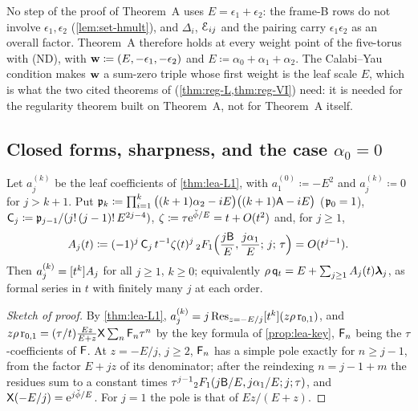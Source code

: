 \begin{rmk}
\label{rmk:lea-cy}
No step of the proof of Theorem~A uses $E=\epsilon_1+\epsilon_2$: the frame-B rows do not involve $\epsilon_1,\epsilon_2$ (\cref{lem:set-hmult}), and $\Delta_i$, $\mathcal{E}_{ij}$ and the pairing carry $\epsilon_1\epsilon_2$ as an overall factor. Theorem~A therefore holds at every weight point of the five-torus with (ND), with $\mathbf{w}\coloneqq(E,-\epsilon_1,-\epsilon_2)$ and $E\coloneqq\alpha_0+\alpha_1+\alpha_2$. The Calabi--Yau condition makes $\mathbf{w}$ a sum-zero triple whose first weight is the leaf scale $E$, which is what the two cited theorems of \cite{LP2} (\cref{thm:reg-L,thm:reg-VI}) need: it is needed for the regularity theorem built on Theorem~A, not for Theorem~A itself.
\end{rmk}

\subsection{Closed forms, sharpness, and the case \texorpdfstring{$\alpha_0=0$}{alpha0 = 0}}
\label{sec:lea-closed}

\begin{thm}
\label{thm:lea-closed}
Let $a_j^{(k)}$ be the leaf coefficients of \cref{thm:lea-L1}, with $a_1^{(0)}\coloneqq-E^2$ and $a_j^{(k)}\coloneqq0$ for $j>k+1$. Put $\mathfrak{p}_k\coloneqq\prod_{i=1}^{k}\big((k+1)\alpha_2-iE\big)\big((k+1)\mathsf{A}-iE\big)$ ($\mathfrak{p}_0=1$), $\mathsf{C}_j\coloneqq\mathfrak{p}_{j-1}/(j!\,(j-1)!\,E^{2j-4})$, $\zeta\coloneqq\tau\mathrm{e}^{\breve{\phi}/E}=t+O(t^2)$ and, for $j\geq1$,
\[
A_j(t)\coloneqq(-1)^j\,\mathsf{C}_j\,t^{-1}\zeta(t)^j\,{}_2F_1\Bigl(\frac{j\mathsf{B}}{E},\frac{j\alpha_1}{E};\,j;\,\tau\Bigr)=O(t^{j-1}).
\]
Then $a_j^{(k)}=[t^k]A_j$ for all $j\geq1$, $k\geq0$; equivalently $\rho\,\mathsf{q}_{t}=E+\sum_{j\geq1}A_j(t)\boldsymbol{\lambda}_j$, as formal series in $t$ with finitely many $j$ at each order.
\end{thm}

\begin{proof}[Sketch of proof]
By \cref{thm:lea-L1}, $a_j^{(k)}=j\operatorname*{Res}_{z=-E/j}[t^k](z\rho\,\mathrm{r}_{0,1})$, and $z\rho\,\mathrm{r}_{0,1}=(\tau/t)\frac{Ez}{E+z}\mathsf{X}\sum_n\mathsf{F}_n\tau^n$ by the key formula of \cref{prop:lea-key}, $\mathsf{F}_n$ being the $\tau$-coefficients of $\mathsf{F}$. At $z=-E/j$, $j\geq2$, $\mathsf{F}_n$ has a simple pole exactly for $n\geq j-1$, from the factor $E+jz$ of its denominator; after the reindexing $n=j-1+m$ the residues sum to a constant times $\tau^{j-1}{}_2F_1(j\mathsf{B}/E,j\alpha_1/E;j;\tau)$, and $\mathsf{X}(-E/j)=\mathrm{e}^{j\breve{\phi}/E}$. For $j=1$ the pole is that of $Ez/(E+z)$.
\end{proof}

